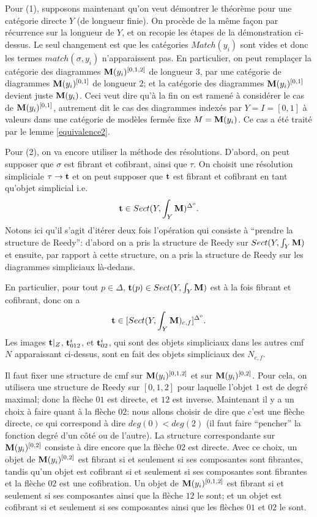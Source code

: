 \documentclass[12pt]{article}
\newcommand{\mm}{{\bf M}}
\begin{document}
Pour (1), supposons maintenant qu'on veut d\'emontrer le th\'eor\`eme pour une
cat\'egorie directe $Y$ (de longueur finie). On proc\`ede de la m\^eme fa\c{c}on
par r\'ecurrence sur la longueur de $Y$, et on recopie les \'etapes de la
d\'emonstration ci-dessus. Le seul changement est que les cat\'egories
$Match(y_i)$ sont vides et donc les termes $match (\sigma , y_i)$
n'apparaissent pas. En particulier, on peut rempla\c{c}er
la cat\'egorie des diagrammes
$\mm (y_i)^{[0,1,2]}$ de longueur $3$, par une cat\'egorie de
diagrammes $\mm (y_i)^{[0,1]}$ de longueur $2$; et la cat\'egorie des diagrammes
$\mm (y_i)^{[0,1]}$ devient juste $\mm (y_i)$. Ceci veut dire qu'\`a la fin
on est ramen\'e \`a consid\'erer le cas de $\mm (y_i)^{[0,1]}$,
autrement dit le cas des diagrammes index\'es par $Y= I=[0,1]$ \`a valeurs dans
une cat\'egorie de mod\`eles ferm\'ee fixe $M=\mm (y_i)$. Ce cas a \'et\'e
trait\'e par le lemme \ref{equivalence2}.

Pour (2), on va encore utiliser la m\'ethode des r\'esolutions. D'abord, on peut
supposer que $\sigma$ est fibrant et cofibrant, ainsi que $\tau$. On choisit
une r\'esolution simpliciale $\tau \rightarrow {\bf t}$ et on peut
supposer que ${\bf t}$ est fibrant et cofibrant en tant qu'objet simplicial
i.e.
$$
{\bf t}\in Sect (Y,\int _Y\mm )^{\Delta ^o}.
$$
Notons ici qu'il s'agit d'it\'erer deux fois l'op\'eration
qui consiste \`a ``prendre la
structure de Reedy'': d'abord on a pris la structure de Reedy sur
$Sect (Y,\int _Y\mm )$ et ensuite, par rapport \`a cette structure, on a pris
la structure de Reedy sur les diagrammes simpliciaux l\`a-dedans.

En particulier,  pour tout $p\in \Delta$, ${\bf t}(p)\in Sect (Y,\int _Y\mm )$
est \`a la fois fibrant et cofibrant, donc on a
$$
{\bf t}\in [Sect (Y,\int _Y\mm )_{c,f}]^{\Delta ^o}.
$$
Les images ${\bf t} |_Z$,  ${\bf t} ^i_{012}$, et  ${\bf t} ^i_{02}$,
qui sont des objets simpliciaux dans les autres cmf $N$ apparaissant ci-dessus,
sont en fait des objets simpliciaux des $N_{c,f}$.

Il faut fixer une structure
de cmf sur $\mm (y_i)^{[0,1,2]}$ et sur $\mm (y_i)^{[0,2]}$. Pour cela, on
utilisera une
structure de Reedy sur $[0,1,2]$ pour laquelle l'objet $1$ est de degr\'e
maximal; donc la fl\`eche $01$ est directe, et $12$ est inverse. Maintenant il
y a un choix \`a faire quant \`a la fl\`eche $02$: nous allons choisir de dire
que c'est une fl\`eche directe, ce qui correspond \`a dire $deg (0)<deg(2)$
(il faut faire ``pencher'' la fonction degr\'e d'un c\^ot\'e ou de l'autre).
La structure correspondante sur $\mm (y_i)^{[0,2]}$ consiste \`a dire
encore que la
fl\`eche $02$ est directe. Avec ce choix, un objet de $\mm (y_i)^{[0,2]}$ est
fibrant si et seulement si ses composantes sont fibrantes, tandis qu'un
objet est
cofibrant si et seulement si ses composantes sont fibrantes et la fl\`eche $02$
est une cofibration. Un objet de $\mm (y_i)^{[0,1,2]}$ est fibrant si et
seulement si
ses composantes ainsi que la fl\`eche $12$ le sont; et un objet est cofibrant si
et seulement si ses composantes ainsi que les fl\`eches $01$ et $02$ le sont.
\end{document}
